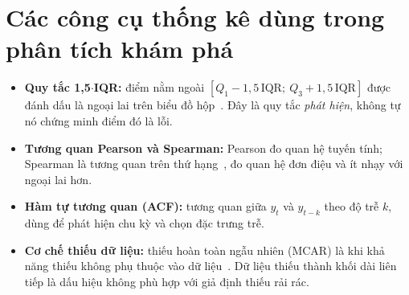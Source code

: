 \documentclass[../main.tex]{subfiles}
\begin{document}
\section{Các công cụ thống kê dùng trong phân tích khám phá}
\begin{itemize}
    \item \textbf{Quy tắc 1,5$\cdot$IQR:} điểm nằm ngoài $[Q_1 - 1{,}5\,\text{IQR};\ Q_3 + 1{,}5\,\text{IQR}]$ được đánh dấu là ngoại lai trên biểu đồ hộp~\cite{tukey1977exploratory}. Đây là quy tắc \textit{phát hiện}, không tự nó chứng minh điểm đó là lỗi.
    \item \textbf{Tương quan Pearson và Spearman:} Pearson đo quan hệ tuyến tính; Spearman là tương quan trên thứ hạng~\cite{spearman1904proof}, đo quan hệ đơn điệu và ít nhạy với ngoại lai hơn.
    \item \textbf{Hàm tự tương quan (ACF):} tương quan giữa $y_t$ và $y_{t-k}$ theo độ trễ $k$, dùng để phát hiện chu kỳ và chọn đặc trưng trễ.
    \item \textbf{Cơ chế thiếu dữ liệu:} thiếu hoàn toàn ngẫu nhiên (MCAR) là khi khả năng thiếu không phụ thuộc vào dữ liệu~\cite{little2019statistical}. Dữ liệu thiếu thành khối dài liên tiếp là dấu hiệu không phù hợp với giả định thiếu rải rác.
\end{itemize}
\end{document}

